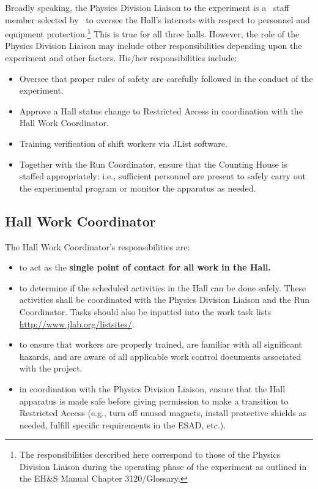 \documentclass[11pt]{article}
\begin{document}
Broadly speaking, the Physics Division Liaison to the experiment 
is a \HALL\ staff member selected by  \HALLLEADER ~to oversee the Hall's interests with respect to personnel and equipment 
protection.\footnote{The responsibilities described here correspond 
to those of the Physics Division Liaison during
the operating phase of the experiment as outlined in the
EH\&S Manual Chapter 3120/Glossary.} 
This is true for all three halls. However, the role of
the Physics Division Liaison may include other responsibilities
depending upon the experiment and other factors. His/her responsibilities
include:
\begin{itemize}
\item Oversee that proper rules of safety are carefully followed in the 
conduct of the experiment.
\item Approve a Hall status change to Restricted Access in coordination
with the Hall Work Coordinator.
\item Training verification of shift workers via JList software.
\item Together with the Run Coordinator, 
ensure that the Counting House is staffed appropriately: i.e.,
sufficient personnel are present to safely carry out the experimental 
program or monitor the apparatus as needed.
\end{itemize}  

\subsection{Hall Work Coordinator}

The Hall Work Coordinator's responsibilities are: 

\begin{itemize}

\item  to act as the {\bf single point of contact for all work in the Hall.}

\item to determine if the scheduled activities in the Hall can be done safely.
These activities shall be coordinated with the Physics Division Liaison
and the Run Coordinator.   Tasks should also be inputted into the work task
lists \url{http://www.jlab.org/listsites/}.

\item to ensure that workers are properly trained, are familiar with all
significant hazards, and are aware of all applicable work control
documents associated with the project. 

\item in coordination with the Physics Division Liaison, 
ensure that the Hall apparatus is made safe before giving permission to
make a transition to Restricted Access (e.g., turn off unused magnets,
install protective shields as needed, fulfill specific requirements in the
ESAD, etc.).

 
\end{itemize}
\end{document}
